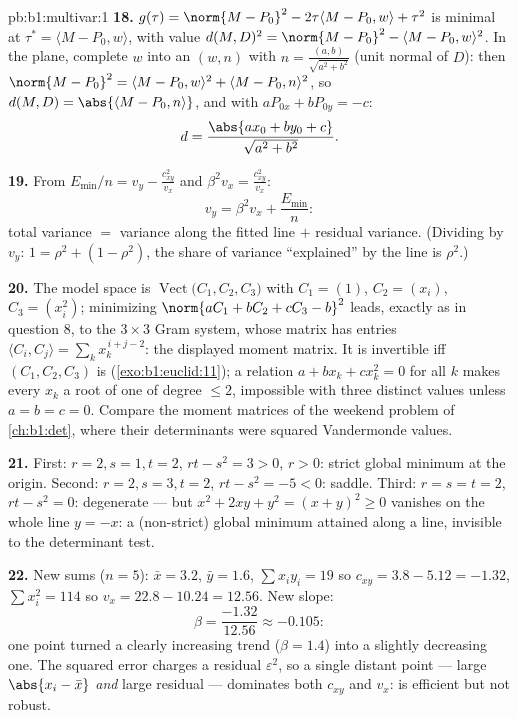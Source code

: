 \begin{solution}{pb:b1:multivar:1}
\textbf{18.} $g(\tau) = \norm{M - P_0}^2 - 2\tau\langle M - P_0,
w\rangle + \tau^2$ is minimal at $\tau^* = \langle M - P_0,
w\rangle$, with value $d(M,D)^2 = \norm{M - P_0}^2 - \langle M -
P_0, w\rangle^2$. In the plane, complete $w$ into an 
 $(w, n)$ with $n = \frac{(a, b)}{\sqrt{a^2+b^2}}$ (unit
normal of $D$): then $\norm{M - P_0}^2 = \langle M - P_0,
w\rangle^2 + \langle M - P_0, n\rangle^2$, so $d(M, D) =
\abs{\langle M - P_0, n\rangle}$, and with $aP_{0x} + bP_{0y} =
-c$:
\[
d = \frac{\abs{a x_0 + b y_0 + c}}{\sqrt{a^2 + b^2}} .
\]

\textbf{19.} From $E_{\min}/n = v_y - \frac{c_{xy}^2}{v_x}$ and
$\beta^2 v_x = \frac{c_{xy}^2}{v_x}$:
\[
v_y = \beta^2 v_x + \frac{E_{\min}}n :
\]
total variance $=$ variance along the fitted line $+$ residual
variance. (Dividing by $v_y$: $1 = \rho^2 + (1 - \rho^2)$, the
share of variance ``explained'' by the line is $\rho^2$.)

\textbf{20.} The model space is
$\operatorname{Vect}\bigl(C_1, C_2, C_3\bigr)$ with $C_1 = (1)$,
$C_2 = (x_i)$, $C_3 = (x_i^2)$; minimizing $\norm{aC_1 + bC_2 +
cC_3 - b}^2$ leads, exactly as in question 8, to the $3\times3$
Gram system, whose matrix has entries $\langle C_i, C_j\rangle =
\sum_k x_k^{\,i+j-2}$: the displayed moment matrix. It is
invertible iff $(C_1, C_2, C_3)$ is 
(\cref{exo:b1:euclid:11}); a relation $a + bx_k + cx_k^2 = 0$
for all $k$ makes every $x_k$ a root of one  of
degree $\leq 2$, impossible with three distinct values unless $a
= b = c = 0$. Compare the moment matrices of the weekend problem
of \cref{ch:b1:det}, where their determinants were squared
Vandermonde values.

\textbf{21.} First: $r = 2, s = 1, t = 2$, $rt - s^2 = 3 > 0$,
$r > 0$: strict global minimum at the origin. Second: $r = 2, s
= 3, t = 2$, $rt - s^2 = -5 < 0$: saddle. Third: $r = s = t =
2$, $rt - s^2 = 0$: degenerate --- but $x^2 + 2xy + y^2 = (x +
y)^2 \geq 0$ vanishes on the whole line $y = -x$: a
(non-strict) global minimum attained along a line, invisible to
the determinant test.

\textbf{22.} New sums ($n = 5$): $\bar x = 3.2$, $\bar y =
1.6$, $\sum x_iy_i = 19$ so $c_{xy} = 3.8 - 5.12 = -1.32$,
$\sum x_i^2 = 114$ so $v_x = 22.8 - 10.24 = 12.56$. New slope:
\[
\beta = \frac{-1.32}{12.56} \approx -0.105 :
\]
one point turned a clearly increasing trend ($\beta = 1.4$) into
a slightly decreasing one. The squared error charges a residual
$\varepsilon^2$, so a single distant point --- large
$\abs{x_{i} - \bar x}$ \emph{and} large residual --- dominates
both $c_{xy}$ and $v_x$:  is efficient but not
robust.


\end{solution}
